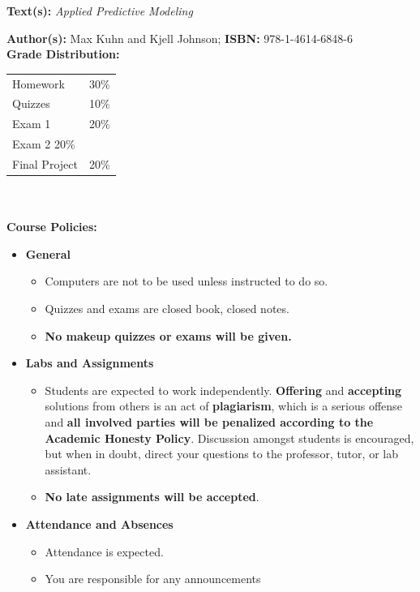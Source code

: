 \documentclass[11pt]{article}
\begin{document}
\textbf {\large Text(s):} \emph{Applied Predictive Modeling}

\textbf {Author(s):} Max Kuhn and Kjell Johnson;  \textbf {ISBN:} 978-1-4614-6848-6 \\


\textbf {\large Grade Distribution:} \\
\hspace*{40mm}
\begin{tabular}{ l l }
Homework & 30\% \\
Quizzes  & 10\% \\
Exam 1 & 20\% \\
Exam 2 20\% \\
Final Project  & 20\% \\
\end{tabular} \\\\


\textbf {\large Course Policies:}
\begin{itemize}
	\item \textbf {General}
		\begin{itemize}
			\item Computers are not to be used unless instructed to do so.
			\item Quizzes and exams are closed book, closed notes.
			\item \textbf {No makeup quizzes or exams will be given.}
		\end{itemize}
	\item \textbf {Labs and Assignments}
		\begin{itemize}
			\item Students are expected to work independently. \textbf{Offering} and \textbf{accepting} solutions from others is an act of \textbf{plagiarism}, which is a serious offense and \textbf{all involved parties will be penalized according to the Academic Honesty Policy}. Discussion amongst students is encouraged, but when in doubt, direct your questions to the professor, tutor, or lab assistant.
			\item \textbf{No late assignments will be accepted}.
		\end{itemize}
	\item \textbf{Attendance and Absences}
		\begin{itemize}
			\item Attendance is expected.
			\item You are responsible for any announcements
		\end{itemize}
\end{itemize}
\end{document}
